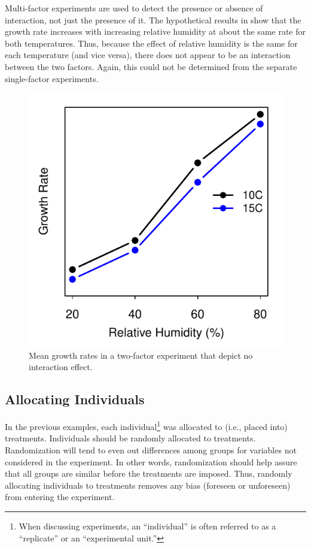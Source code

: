 \documentclass[10pt,openany]{book}\usepackage[]{graphicx}\usepackage[]{color}
\newenvironment{knitrout}{}{} %
\begin{document}
Multi-factor experiments are used to detect the presence or absence of interaction, not just the presence of it.  The hypothetical results in  show that the growth rate increases with increasing relative humidity at about the same rate for both temperatures.  Thus, because the effect of relative humidity is the same for each temperature (and vice versa), there does not appear to be an interaction between the two factors.  Again, this could not be determined from the separate single-factor experiments.

\begin{knitrout}
\color{fgcolor}\begin{figure}[hbtp]

{\centering \includegraphics[width=.4\linewidth]{Figs/ExpDNoInt-1} 

}

\caption[Mean growth rates in a two-factor experiment that depict no interaction effect]{Mean growth rates in a two-factor experiment that depict no interaction effect.}\label{fig:ExpDNoInt}
\end{figure}


\end{knitrout}



\subsection{Allocating Individuals}
In the previous examples, each individual\footnote{When discussing experiments, an ``individual'' is often referred to as a ``replicate'' or an ``experimental unit.''} was allocated to (i.e., placed into) treatments.  Individuals should be randomly allocated to treatments.  Randomization will tend to even out differences among groups for variables not considered in the experiment.  In other words, randomization should help assure that all groups are similar before the treatments are imposed.  Thus, randomly allocating individuals to treatments removes any bias (foreseen or unforeseen) from entering the experiment.
\end{document}
